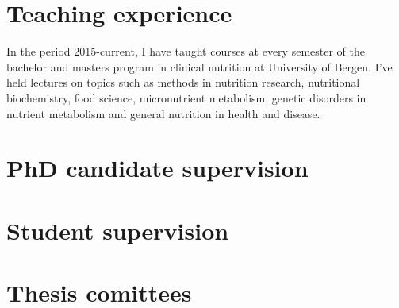 \documentclass[11pt, a4paper]{awesome-cv}
\begin{document}
\hypertarget{teaching-experience}{%
\section{Teaching experience}\label{teaching-experience}}

In the period 2015-current, I have taught courses at every semester of
the bachelor and masters program in clinical nutrition at University of
Bergen. I've held lectures on topics such as methods in nutrition
research, nutritional biochemistry, food science, micronutrient
metabolism, genetic disorders in nutrient metabolism and general
nutrition in health and disease.

\hypertarget{phd-candidate-supervision}{%
\section{PhD candidate supervision}\label{phd-candidate-supervision}}

\begin{cvhonors}
\end{cvhonors}

\hypertarget{student-supervision}{%
\section{Student supervision}\label{student-supervision}}

\begin{cvhonors}
\end{cvhonors}

\hypertarget{thesis-comittees}{%
\section{Thesis comittees}\label{thesis-comittees}}
\end{document}
